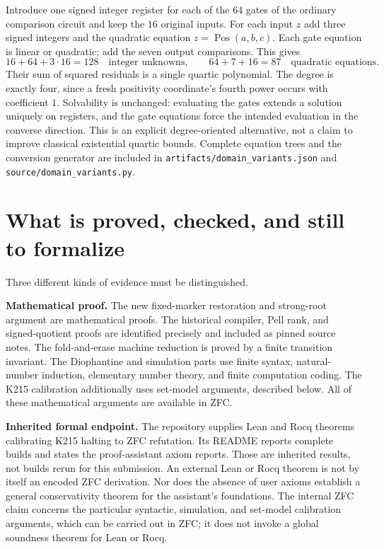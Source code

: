 \documentclass[11pt,a4paper]{article}
\theoremstyle{remark}
\newcommand{\code}[1]{\nolinkurl{#1}}
\begin{document}
Introduce one signed integer register for each of the $64$ gates of
the ordinary comparison circuit and keep the $16$ original inputs.
For each input $z$ add three signed integers and the quadratic equation
$z=\operatorname{Pos}(a,b,c)$. Each gate equation is linear or
quadratic; add the seven output comparisons. This gives
\[
 16+64+3\cdot16=128\quad\text{integer unknowns},\qquad
 64+7+16=87\quad\text{quadratic equations}.
\]
Their sum of squared residuals is a single quartic polynomial. The
degree is exactly four, since a fresh positivity coordinate's fourth
power occurs with coefficient $1$. Solvability is unchanged: evaluating
the gates extends a solution uniquely on registers, and the gate
equations force the intended evaluation in the converse direction.
This is an explicit degree-oriented alternative, not a claim to improve
classical existential quartic bounds. Complete equation trees and the
conversion generator are included in \code{artifacts/domain_variants.json}
and \code{source/domain_variants.py}.

\section{What is proved, checked, and still to formalize}
\label{sec:formal}

Three different kinds of evidence must be distinguished.

\textbf{Mathematical proof.} The new fixed-marker restoration and
strong-root argument are mathematical proofs. The historical compiler,
Pell rank, and signed-quotient proofs are identified precisely and
included as pinned source notes. The fold-and-erase machine reduction
is proved by a finite transition invariant. The Diophantine and simulation parts use finite syntax, natural-number
induction, elementary number theory, and finite computation coding.
The K215 calibration additionally uses set-model arguments, described
below. All of these mathematical arguments are available in ZFC.

\textbf{Inherited formal endpoint.} The repository supplies Lean and
Rocq theorems calibrating K215 halting to ZFC refutation. Its README
reports complete builds and states the proof-assistant axiom reports.
Those are inherited results, not builds rerun for this submission.
An external Lean or Rocq theorem is not by itself an encoded ZFC
derivation. Nor does the absence of user axioms establish a general
conservativity theorem for the assistant's foundations. The internal
ZFC claim concerns the particular syntactic, simulation, and set-model
calibration arguments, which can be carried out in ZFC; it does not invoke a
global soundness theorem for Lean or Rocq.
\end{document}
